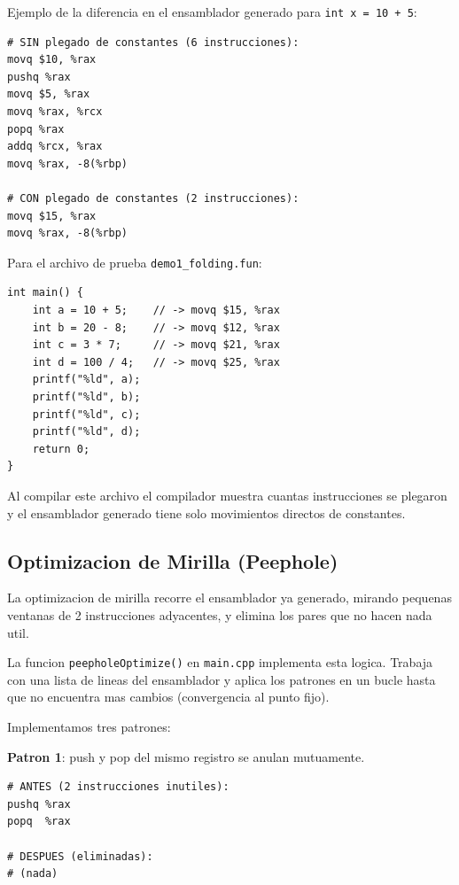 \documentclass[12pt, a4paper]{article}
\begin{document}
Ejemplo de la diferencia en el ensamblador generado para \texttt{int x = 10 + 5}:

\begin{lstlisting}[style=asmstyle, caption={Comparacion: sin vs con plegado de constantes}]
# SIN plegado de constantes (6 instrucciones):
movq $10, %rax
pushq %rax
movq $5, %rax
movq %rax, %rcx
popq %rax
addq %rcx, %rax
movq %rax, -8(%rbp)

# CON plegado de constantes (2 instrucciones):
movq $15, %rax
movq %rax, -8(%rbp)
\end{lstlisting}

Para el archivo de prueba \texttt{demo1\_folding.fun}:

\begin{lstlisting}[style=csstyle, caption={Codigo de prueba para plegado de constantes}]
int main() {
    int a = 10 + 5;    // -> movq $15, %rax
    int b = 20 - 8;    // -> movq $12, %rax
    int c = 3 * 7;     // -> movq $21, %rax
    int d = 100 / 4;   // -> movq $25, %rax
    printf("%ld", a);
    printf("%ld", b);
    printf("%ld", c);
    printf("%ld", d);
    return 0;
}
\end{lstlisting}

Al compilar este archivo el compilador muestra cuantas instrucciones se plegaron y el ensamblador generado tiene solo movimientos directos de constantes.

\subsection{Optimizacion de Mirilla (Peephole)}

La optimizacion de mirilla recorre el ensamblador ya generado, mirando pequenas ventanas de 2 instrucciones adyacentes, y elimina los pares que no hacen nada util.

La funcion \texttt{peepholeOptimize()} en \texttt{main.cpp} implementa esta logica. Trabaja con una lista de lineas del ensamblador y aplica los patrones en un bucle hasta que no encuentra mas cambios (convergencia al punto fijo).

Implementamos tres patrones:

\textbf{Patron 1}: push y pop del mismo registro se anulan mutuamente.
\begin{lstlisting}[style=asmstyle, caption={Patron peephole 1: push/pop del mismo registro}]
# ANTES (2 instrucciones inutiles):
pushq %rax
popq  %rax

# DESPUES (eliminadas):
# (nada)
\end{lstlisting}
\end{document}
